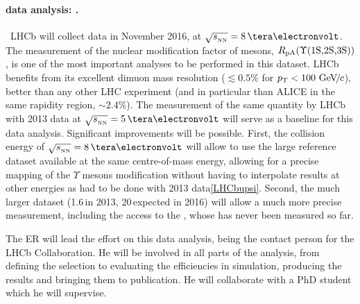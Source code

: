 \documentclass[a4paper,11pt]{article}
\newcommand{\ER}{ER\xspace}
\begin{document}
\paragraph{\pPb data analysis: \PgUabc. }\ 
LHCb will collect \pPb data in November 2016, at $\sqrtsnn = 8\,\TeV$. The measurement of the nuclear modification factor of \PgU mesons, $R_{\text{pA}} (\Upsilon\text{(1S,2S,3S)})$, is one of the most important analyses to be performed in this dataset. LHCb benefits from its excellent dimuon mass resolution ($\lesssim 0.5\%$ for $p_{\text{T}} < 100\,{\,\text{Ge\hspace{-.08em}V\hspace{-0.16em}/\hspace{-0.08em}}c}$), %
better than any other LHC experiment (and in particular than ALICE in the same rapidity region, $\sim 2.4\%$). %
The measurement of the same quantity by LHCb with 2013 \pPb data at $\sqrtsnn = 5\,\TeV$ will serve as a baseline for this data analysis. Significant improvements will be possible. First, the collision energy of $\sqrtsnn = 8\,\TeV$ will allow to use the large \pp reference dataset available at the same centre-of-mass energy, allowing for a precise mapping of the $\Upsilon$ mesons modification without having to interpolate results at other energies as had to be done with 2013 \pPb data\cref{LHCbupsi}. %
Second, the much larger dataset (1.6\,\nbinv in 2013, 20\,\nbinv expected in 2016) will allow a much more precise measurement, including the access to the \PgUc, whose \rpa has never been measured so far.

The \ER will lead the effort on this data analysis, being the contact person for the LHCb Collaboration. He will be involved in all parts of the analysis, from defining the selection to evaluating the efficiencies in simulation, producing the results and bringing them to publication. He will collaborate with a PhD student which he will supervise.
\end{document}
